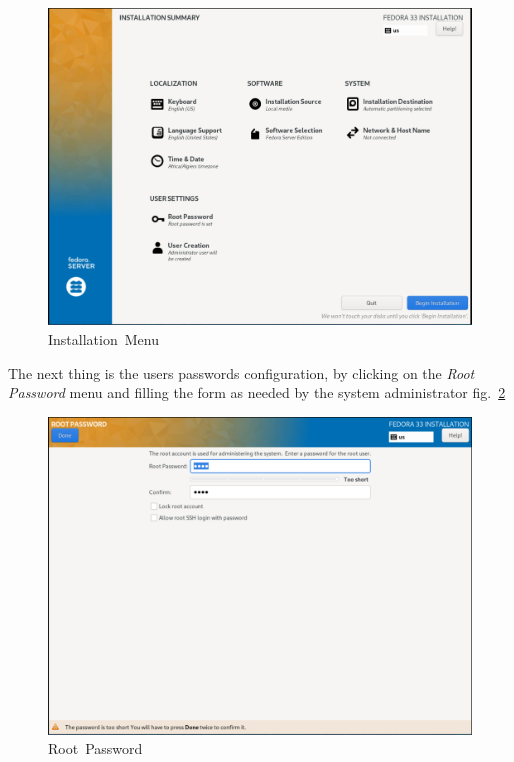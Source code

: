 \documentclass[
  14pt,
  english,
  a4paper,
]{scrreprt}
\begin{document}
\begin{figure}[!htb]
\hypertarget{fig:fedmenu}{%
\centering
\includegraphics{figures/screenshots/fedora_menu.png}
\caption{Installation~Menu}\label{fig:fedmenu}
}
\end{figure}

The next thing is the users passwords configuration, by clicking on the
\emph{Root Password} menu and filling the form as needed by the system
administrator fig.~\ref{fig:fedrootpass}

\begin{figure}[!htb]
\hypertarget{fig:fedrootpass}{%
\centering
\includegraphics{figures/screenshots/fedora_root_pass.png}
\caption{Root~Password}\label{fig:fedrootpass}
}
\end{figure}
\end{document}
